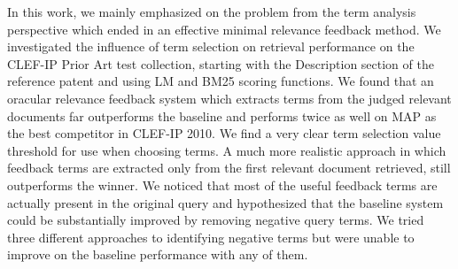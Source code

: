 In this work, we mainly emphasized on the problem from the term analysis perspective which ended in an effective minimal relevance feedback method. We investigated the influence of term selection on retrieval performance on the CLEF-IP Prior Art test collection, starting with the Description section of the reference patent and using LM and BM25 scoring functions. We found that an oracular relevance feedback system which extracts terms from the judged relevant documents far outperforms the baseline and  performs twice as well on MAP as the best competitor in CLEF-IP 2010.  We find a very clear term selection value threshold for use when choosing terms.  A much more realistic approach in which feedback terms are extracted only from the first relevant document retrieved, still outperforms the winner.   We noticed that most of the useful feedback terms are actually present in the original query and hypothesized that the baseline system could be substantially improved by removing negative query terms.  We tried three different approaches to identifying negative terms but were unable to improve on the baseline performance with any of them.
